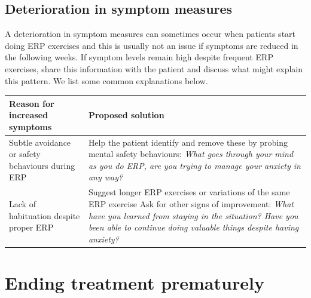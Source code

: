 \documentclass[]{book}
\begin{document}
\hypertarget{deterioration-in-symptom-measures}{%
\subsection{Deterioration in symptom measures}\label{deterioration-in-symptom-measures}}

A deterioration in symptom measures can sometimes occur when patients start doing ERP exercises and this is usually not an issue if symptoms are reduced in the following weeks. If symptom levels remain high despite frequent ERP exercises, share this information with the patient and discuss what might explain this pattern. We list some common explanations below.

\begin{longtable}[]{@{}ll@{}}
\toprule
\begin{minipage}[b]{0.47\columnwidth}\raggedright
Reason for increased symptoms\strut
\end{minipage} & \begin{minipage}[b]{0.47\columnwidth}\raggedright
Proposed solution\strut
\end{minipage}\tabularnewline
\midrule
\endhead
\begin{minipage}[t]{0.47\columnwidth}\raggedright
Subtle avoidance or safety behaviours during ERP\strut
\end{minipage} & \begin{minipage}[t]{0.47\columnwidth}\raggedright
Help the patient identify and remove these by probing mental safety behaviours: \emph{What goes through your mind as you do ERP, are you trying to manage your anxiety in any way?}\strut
\end{minipage}\tabularnewline
\begin{minipage}[t]{0.47\columnwidth}\raggedright
Lack of habituation despite proper ERP\strut
\end{minipage} & \begin{minipage}[t]{0.47\columnwidth}\raggedright
Suggest longer ERP exercises or variations of the same ERP exercise Ask for other signs of improvement: \emph{What have you learned from staying in the situation? Have you been able to continue doing valuable things despite having anxiety?}\strut
\end{minipage}\tabularnewline
\bottomrule
\end{longtable}

\hypertarget{ending-treatment-prematurely}{%
\section{Ending treatment prematurely}\label{ending-treatment-prematurely}}
\end{document}
